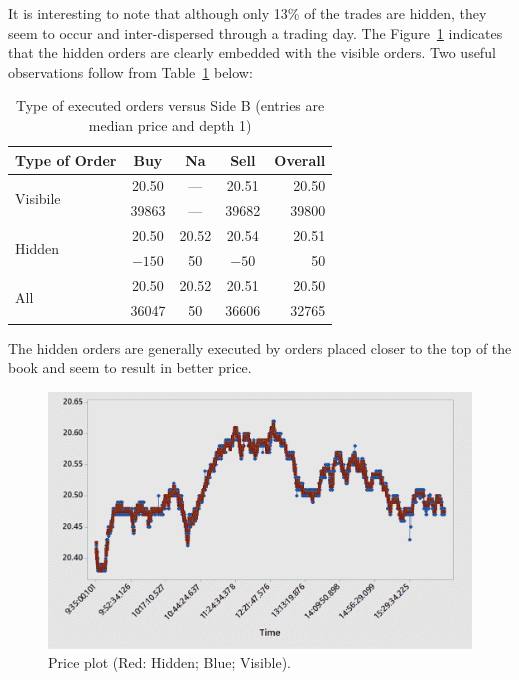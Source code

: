 It is interesting to note that although only 13\% of the trades are hidden, they seem to occur and inter-dispersed through a trading day. The Figure~\ref{fig:priceplothidvis} indicates that the hidden orders are clearly embedded with the visible orders. Two useful observations follow from Table~\ref{tab:typeexc} below:
	\begin{table}[!ht]
	\centering
	\caption{Type of executed orders versus Side B (entries are median price and depth 1) \label{tab:typeexc}}
	\begin{tabular}{l | ccc| r}
	Type of Order & Buy & Na & Sell & Overall \\ \hline
	\multirow{2}{*}{Visibile} & 20.50 & --- & 20.51 & 20.50 \\
	& 39863 & --- & 39682 & 39800 \\
	\multirow{2}{*}{Hidden} & 20.50 & 20.52 & 20.54 & 20.51 \\
	& $-150$ & 50 & $-50$ & 50 \\ \hline
	\multirow{2}{*}{All} & 20.50 & 20.52 & 20.51 & 20.50 \\
	& 36047 & 50 & 36606 & 32765
	\end{tabular}
	\end{table}
The hidden orders are generally executed by orders placed closer to the top of the book and seem to result in better price.
	\begin{figure}[!ht]
	\centering
	\includegraphics[width=\textwidth]{chapters/chapter_trade_data_models/figures/priceplot.png}
	\caption{Price plot (Red: Hidden; Blue; Visible). \label{fig:priceplothidvis}}
	\end{figure}


